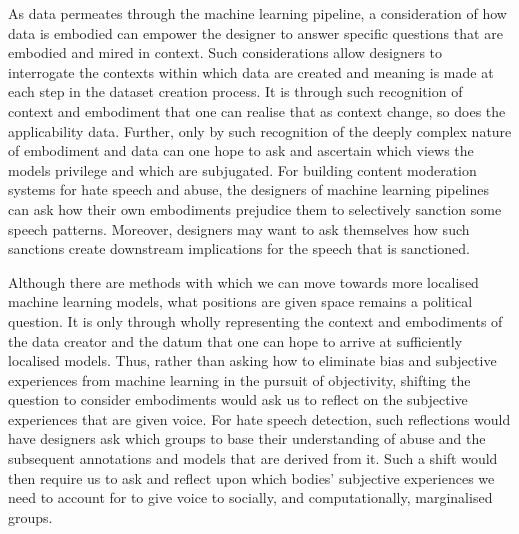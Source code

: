 As data permeates through the machine learning pipeline, a consideration of how data is embodied can empower the designer to answer specific questions that are embodied and mired in context.
Such considerations allow designers to interrogate the contexts within which data are created and meaning is made at each step in the dataset creation process.
It is through such recognition of context and embodiment that one can realise that as context change, so does the applicability data.
Further, only by such recognition of the deeply complex nature of embodiment and data can one hope to ask and ascertain which views the models privilege and which are subjugated.
For building content moderation systems for hate speech and abuse, the designers of machine learning pipelines can ask how their own embodiments prejudice them to selectively sanction some speech patterns.
Moreover, designers may want to ask themselves how such sanctions create downstream implications for the speech that is sanctioned.

Although there are methods with which we can move towards more localised machine learning models, what positions are given space remains a political question.
It is only through wholly representing the context and embodiments of the data creator and the datum that one can hope to arrive at sufficiently localised models.
Thus, rather than asking how to eliminate bias and subjective experiences from machine learning in the pursuit of objectivity, shifting the question to consider embodiments would ask us to reflect on the subjective experiences that are given voice.
For hate speech detection, such reflections would have designers ask which groups to base their understanding of abuse and the subsequent annotations and models that are derived from it.
Such a shift would then require us to ask and reflect upon which bodies' subjective experiences we need to account for to give voice to socially, and computationally, marginalised groups.

